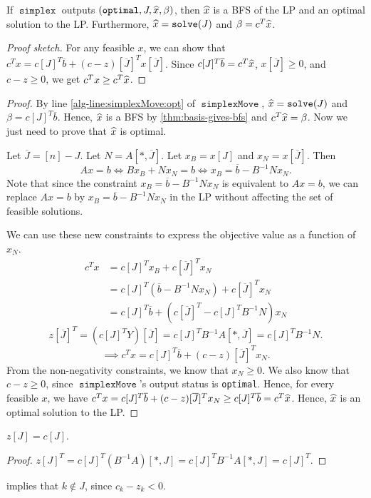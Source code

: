 \documentclass[a4paper, 12pt, fleqn]{article}
\newcommand*{\Jcomp}{\overline{J}}
\newcommand*{\bline}{\overline{b}}
\DeclareMathOperator{\solve}{\mathtt{solve}}
\DeclareMathOperator{\simplex}{\mathtt{simplex}}
\DeclareMathOperator{\simplexMove}{\mathtt{simplexMove}}
\newenvironment*{longProof}{\begin{proof}}{\end{proof}}
\begin{document}
\begin{theorem}
\label{thm:simplex-optimal}
If $\simplex$ outputs $(\mathtt{optimal}, J, \widehat{x}, \beta)$,
then $\widehat{x}$ is a BFS of the LP and an optimal solution to the LP.
Furthermore, $\xhat = \solve(J)$ and $\beta = c^T\widehat{x}$.
\end{theorem}
\begin{proof}[Proof sketch]
For any feasible $x$, we can show that $c^Tx = c[J]^T\bline + (c-z)[\Jcomp]^Tx[\Jcomp]$.
Since $c[J]^T\bline = c^T\xhat$, $x[\Jcomp] \ge 0$, and $c - z \ge 0$,
we get $c^Tx \ge c^T\widehat{x}$.
\end{proof}
\begin{longProof}
By line \ref{alg-line:simplexMove:opt} of $\simplexMove$,
$\xhat = \solve(J)$ and $\beta = c[J]^T\bline$.
Hence, $\widehat{x}$ is a BFS by \cref{thm:basis-gives-bfs} and $c^T\widehat{x} = \beta$.
Now we just need to prove that $\widehat{x}$ is optimal.

Let $\Jcomp = [n] - J$. Let $N = A[*,\Jcomp]$.
Let $x_B = x[J]$ and $x_N = x[\Jcomp]$. Then
\[ Ax = b \iff Bx_B + Nx_N = b \iff x_B = \bline - B^{-1}Nx_N. \]
Note that since the constraint $x_B = \bline - B^{-1}Nx_N$ is equivalent to $Ax = b$,
we can replace $Ax = b$ by $x_B = \bline - B^{-1}Nx_N$ in the LP without affecting
the set of feasible solutions.

We can use these new constraints to express the objective value as a function of $x_N$.
\begin{align*}
c^Tx &= c[J]^Tx_B + c[\Jcomp]^Tx_N
\\ &= c[J]^T\left(\bline - B^{-1}Nx_N\right) + c[\Jcomp]^Tx_N
\\ &= c[J]^T\bline + (c[\Jcomp]^T - c[J]^TB^{-1}N)x_N
\end{align*}
\[ z[\Jcomp]^T = (c[J]^TY)[\Jcomp] = c[J]^TB^{-1}A[*,\Jcomp] = c[J]^TB^{-1}N. \]
\[ \implies c^Tx = c[J]^T\bline + (c-z)[\Jcomp]^Tx_N. \]
From the non-negativity constraints, we know that $x_N \ge 0$.
We also know that $c-z \ge 0$, since $\simplexMove$'s output status is \texttt{optimal}.
Hence, for every feasible $x$, we have
$c^Tx = c[J]^T\bline + (c-z)[\Jcomp]^Tx_N \ge c[J]^T\bline = c^T\xhat$.
Hence, $\widehat{x}$ is an optimal solution to the LP.
\end{longProof}

\begin{lemma}
\label{thm:zJ-eq-cJ}
$z[J] = c[J]$.
\end{lemma}
\begin{proof}
$z[J]^T = c[J]^T(B^{-1}A)[*,J] = c[J]^TB^{-1}A[*,J] = c[J]^T$.
\end{proof}
 implies that $k \not\in J$, since $c_k - z_k < 0$.
\end{document}
